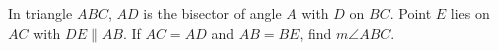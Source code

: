 In triangle $ABC$, $AD$ is the bisector of angle $A$ with $D$ on $BC$. Point $E$ lies on $AC$ with $DE\parallel AB$. If $AC=AD$ and $AB=BE$, find $m\angle ABC$.
